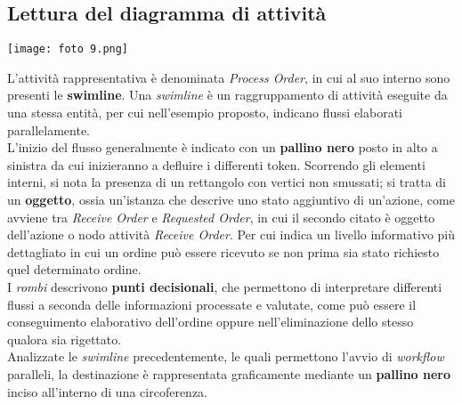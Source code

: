 \documentclass{article}
\begin{document}
\subsection*{Lettura del diagramma di attività}
\large
\begin{center}
    \texttt{[image: foto 9.png]}
\end{center}
L'attività rappresentativa è denominata \textit{Process Order}, in cui al suo interno sono presenti le \textbf{swimline}. Una \textit{swimline} è un raggruppamento di attività eseguite da una stessa entità, per cui nell'esempio proposto, indicano flussi elaborati parallelamente.\vspace*{14pt}\\
L'inizio del flusso generalmente è indicato con un \textbf{pallino nero} posto in alto a sinistra da cui inizieranno a defluire i differenti token. Scorrendo gli elementi interni, si nota la presenza di un rettangolo con vertici non smussati; si tratta di un \textbf{oggetto}, ossia un'istanza che descrive uno stato aggiuntivo di un'azione, come avviene tra \textit{Receive Order} e \textit{Requested Order}, in cui il secondo citato è oggetto dell'azione o nodo attività \textit{Receive Order}. Per cui indica un livello informativo più dettagliato in cui un ordine può essere ricevuto se non prima sia stato richiesto quel determinato ordine.\vspace*{14pt}\\
I \textit{rombi} descrivono \textbf{punti decisionali}, che permettono di interpretare differenti flussi a seconda delle informazioni processate e valutate, come può essere il conseguimento elaborativo dell'ordine oppure nell'eliminazione dello stesso qualora sia rigettato.\vspace*{14pt}\\
Analizzate le \textit{swimline} precedentemente, le quali permettono l'avvio di \textit{workflow} paralleli, la destinazione è rappresentata graficamente mediante un \textbf{pallino nero} inciso all'interno di una circoferenza.
\end{document}
